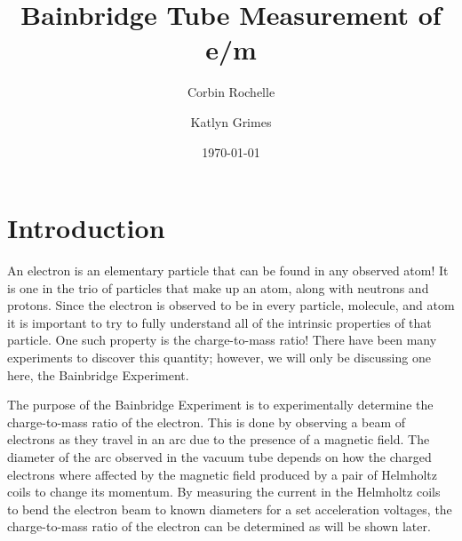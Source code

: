 \documentclass[aps,prl,10pt,twocolumn,floatfix]{revtex4-2}
\begin{document}
\begin{abstract}
\end{abstract}


\title{Bainbridge Tube Measurement of e/m}
\author{Corbin Rochelle}
\author{Katlyn Grimes}
\date{\today}

\maketitle

\section{Introduction}\label{Intro}

An electron is an elementary particle that can be found in any observed atom!
It is one in the trio of particles that make up an atom, along with neutrons and protons.
Since the electron is observed to be in every particle, molecule, and atom it is important to try to fully understand all of the intrinsic properties of that particle. 
One such property is the charge-to-mass ratio!
There have been many experiments to discover this quantity; however, we will only be discussing one here, the Bainbridge Experiment.  

The purpose of the Bainbridge Experiment is to experimentally determine the charge-to-mass ratio of the electron.
This is done by observing a beam of electrons as they travel in an arc due to the presence of a magnetic field\cite{WingerBain}.
The diameter of the arc observed in the vacuum tube depends on how the charged electrons where affected by the magnetic field produced by a pair of Helmholtz coils to change its momentum.
By measuring the current in the Helmholtz coils to bend the electron beam to known diameters for a set acceleration voltages, the charge-to-mass ratio of the electron can be determined as will be shown later.
\end{document}
